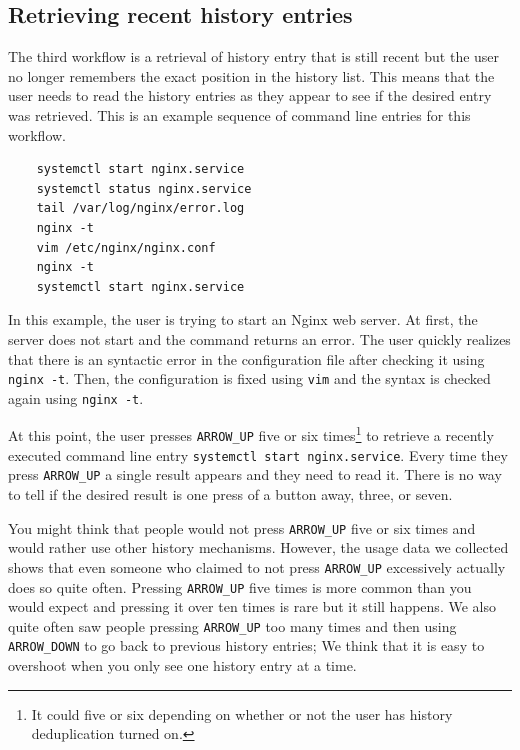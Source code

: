 \subsection{Retrieving recent history entries}\label{workflow-recent-history-arrow-up}
The third workflow is a retrieval of history entry that is still recent but the user no longer remembers the exact position in the history list. This means that the user needs to read the history entries as they appear to see if the desired entry was retrieved. This is an example sequence of command line entries for this workflow.

\begin{verbatim}
    systemctl start nginx.service
    systemctl status nginx.service
    tail /var/log/nginx/error.log
    nginx -t
    vim /etc/nginx/nginx.conf
    nginx -t
    systemctl start nginx.service
\end{verbatim}

In this example, the user is trying to start an Nginx \cite{reese2008nginx} web server. At first, the server does not start and the command returns an error. The user quickly realizes that there is an syntactic error in the configuration file after checking it using \verb|nginx -t|. Then, the configuration is fixed using \verb|vim| and the syntax is checked again using \verb|nginx -t|. 

At this point, the user presses \verb|ARROW_UP| five or six times\footnote{It could five or six depending on whether or not the user has history deduplication turned on.} to retrieve a recently executed command line entry \verb|systemctl start nginx.service|. Every time they press \verb|ARROW_UP| a single result appears and they need to read it. There is no way to tell if the desired result is one press of a button away, three, or seven. %



You might think that people would not press \verb|ARROW_UP| five or six times and would rather use other history mechanisms.
However, the usage data we collected shows that even someone who claimed to not press \verb|ARROW_UP| excessively actually does so quite often. Pressing \verb|ARROW_UP| five times is more common than you would expect and pressing it over ten times is rare but it still happens. We also quite often saw people pressing \verb|ARROW_UP| too many times and then using \verb|ARROW_DOWN| to go back to previous history entries; We think that it is easy to overshoot when you only see one history entry at a time.

